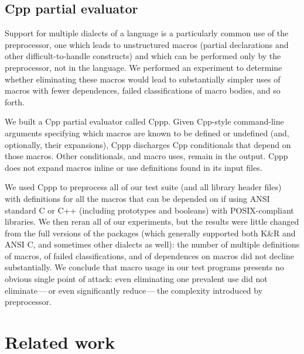 \documentclass[10pt]{article}
\begin{document}
\subsection{Cpp partial evaluator}

Support for multiple dialects of a language is a particularly common use of
the preprocessor, one which leads to unstructured macros (partial
declarations and other difficult-to-handle constructs) and which can be
performed only by the preprocessor, not in the language.  We performed an
experiment to determine whether eliminating these macros would lead to
substantially simpler uses of macros with fewer dependences, failed
classifications of macro bodies, and so forth.

We built a Cpp partial evaluator called Cppp.  Given Cpp-style command-line
arguments specifying which macros are known to be defined or undefined
(and, optionally, their expansions), Cppp discharges Cpp conditionals that
depend on those macros.  Other conditionals, and macro uses, remain in the
output.  Cppp does not expand macros inline or use definitions found in its
input files.


We used Cppp to preprocess all of our test suite (and all library header
files) with definitions for all the macros that can be depended on if using
ANSI standard C or C++ (including prototypes and booleans) with
POSIX-compliant libraries.  We then reran all of our experiments, but the
results were little changed from the full versions of the packages (which
generally supported both K\&R and ANSI C, and sometimes other dialects as
well): the number of multiple definitions of macros, of failed
classifications, and of dependences on macros did not decline
substantially.  We conclude that macro usage in our test programs presents
no obvious single point of attack: even eliminating one prevalent use did
not eliminate\,---\,or even significantly reduce\,---\,the complexity
introduced by preprocessor.


\section{Related work}
\label{sec:related}

\end{document}
